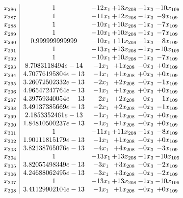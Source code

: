 \documentclass[11pt]{article}
\begin{document}
\[\begin{array}{c| c c@{\hskip 2pt} c@{\hskip 2pt} c@{\hskip 2pt} c@{\hskip 2pt} }
 x_{286}   &  1 & -12 x_{1} & + 13 x_{208} & -1 x_{3} & -10 x_{109}\\
 x_{287}   &  1 & -11 x_{1} & + 12 x_{208} & -1 x_{3} & -9 x_{109}\\
 x_{288}   &  1 & -10 x_{1} & + 10 x_{208} & -1 x_{3} & -7 x_{109}\\
 x_{289}   &  1 & -10 x_{1} & + 10 x_{208} & -1 x_{3} & -7 x_{109}\\
 x_{290}   &  0.999999999999 & -10 x_{1} & + 11 x_{208} & -1 x_{3} & -8 x_{109}\\
 x_{291}   &  1 & -13 x_{1} & + 13 x_{208} & -1 x_{3} & -10 x_{109}\\
 x_{292}   &  1 & -10 x_{1} & + 10 x_{208} & -1 x_{3} & -7 x_{109}\\
 x_{293}   &  8.7083118494e-14 & -1 x_{1} & + 1 x_{208} & -0 x_{3} & + 0 x_{109}\\
 x_{294}   &  4.70776195804e-13 & -1 x_{1} & + 1 x_{208} & + 0 x_{3} & + 0 x_{109}\\
 x_{295}   &  3.26072502332e-13 & -2 x_{1} & + 2 x_{208} & -0 x_{3} & -1 x_{109}\\
 x_{296}   &  4.96547247764e-13 & -1 x_{1} & + 1 x_{208} & + 0 x_{3} & + 0 x_{109}\\
 x_{297}   &  4.39759340054e-13 & -2 x_{1} & + 2 x_{208} & -0 x_{3} & -1 x_{109}\\
 x_{298}   &  3.49137385669e-13 & -2 x_{1} & + 2 x_{208} & -0 x_{3} & -1 x_{109}\\
 x_{299}   &  2.1853352461e-13 & -1 x_{1} & + 1 x_{208} & -0 x_{3} & + 0 x_{109}\\
 x_{300}   &  1.84810500237e-13 & -1 x_{1} & + 1 x_{208} & -0 x_{3} & + 0 x_{109}\\
 x_{301}   &  1 & -11 x_{1} & + 11 x_{208} & -1 x_{3} & -8 x_{109}\\
 x_{302}   &  1.90111815179e-13 & -1 x_{1} & + 1 x_{208} & -0 x_{3} & + 0 x_{109}\\
 x_{303}   &  3.82138765076e-13 & -4 x_{1} & + 4 x_{208} & -0 x_{3} & -3 x_{109}\\
 x_{304}   &  1 & -13 x_{1} & + 13 x_{208} & -1 x_{3} & -10 x_{109}\\
 x_{305}   &  3.82055498349e-13 & -3 x_{1} & + 3 x_{208} & -0 x_{3} & -2 x_{109}\\
 x_{306}   &  4.24688062495e-13 & -3 x_{1} & + 3 x_{208} & -0 x_{3} & -2 x_{109}\\
 x_{307}   &  1 & -13 x_{1} & + 13 x_{208} & -1 x_{3} & -10 x_{109}\\
 x_{308}   &  3.41129902104e-13 & -1 x_{1} & + 1 x_{208} & -0 x_{3} & + 0 x_{109}\\

\end{array}\]
\end{document}
